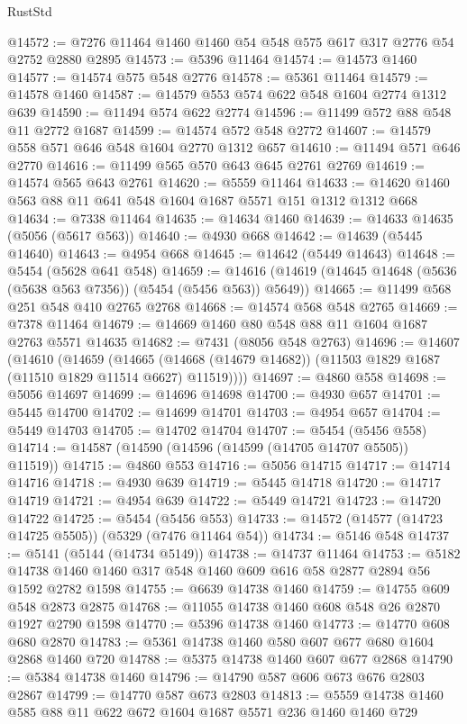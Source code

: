 \begin{lexlean}{RustStd}
\begin{coremodule}
@14572 := @7276 @11464 @1460 @1460 @54 @548 @575 @617 @317 @2776 @54 @2752 @2880 @2895
@14573 := @5396 @11464
@14574 := @14573 @1460
@14577 := @14574 @575 @548 @2776
@14578 := @5361 @11464
@14579 := @14578 @1460
@14587 := @14579 @553 @574 @622 @548 @1604 @2774 @1312 @639
@14590 := @11494 @574 @622 @2774
@14596 := @11499 @572 @88 @548 @11 @2772 @1687
@14599 := @14574 @572 @548 @2772
@14607 := @14579 @558 @571 @646 @548 @1604 @2770 @1312 @657
@14610 := @11494 @571 @646 @2770
@14616 := @11499 @565 @570 @643 @645 @2761 @2769
@14619 := @14574 @565 @643 @2761
@14620 := @5559 @11464
@14633 := @14620 @1460 @563 @88 @11 @641 @548 @1604 @1687 @5571 @151 @1312 @1312 @668
@14634 := @7338 @11464
@14635 := @14634 @1460
@14639 := @14633 @14635 (@5056 (@5617 @563))
@14640 := @4930 @668
@14642 := @14639 (@5445 @14640)
@14643 := @4954 @668
@14645 := @14642 (@5449 @14643)
@14648 := @5454 (@5628 @641 @548)
@14659 := @14616 (@14619 (@14645 @14648 (@5636 (@5638 @563 @7356)) (@5454 (@5456 @563)) @5649))
@14665 := @11499 @568 @251 @548 @410 @2765 @2768
@14668 := @14574 @568 @548 @2765
@14669 := @7378 @11464
@14679 := @14669 @1460 @80 @548 @88 @11 @1604 @1687 @2763 @5571 @14635
@14682 := @7431 (@8056 @548 @2763)
@14696 := @14607
    (@14610
      (@14659
        (@14665 (@14668 (@14679 @14682)) (@11503 @1829 @1687 (@11510 @1829 @11514 @6627) @11519))))
@14697 := @4860 @558
@14698 := @5056 @14697
@14699 := @14696 @14698
@14700 := @4930 @657
@14701 := @5445 @14700
@14702 := @14699 @14701
@14703 := @4954 @657
@14704 := @5449 @14703
@14705 := @14702 @14704
@14707 := @5454 (@5456 @558)
@14714 := @14587 (@14590 (@14596 (@14599 (@14705 @14707 @5505)) @11519))
@14715 := @4860 @553
@14716 := @5056 @14715
@14717 := @14714 @14716
@14718 := @4930 @639
@14719 := @5445 @14718
@14720 := @14717 @14719
@14721 := @4954 @639
@14722 := @5449 @14721
@14723 := @14720 @14722
@14725 := @5454 (@5456 @553)
@14733 := @14572 (@14577 (@14723 @14725 @5505)) (@5329 (@7476 @11464 @54))
@14734 := @5146 @548
@14737 := @5141 (@5144 (@14734 @5149))
@14738 := @14737 @11464
@14753 := @5182 @14738 @1460 @1460 @317 @548 @1460 @609 @616 @58 @2877 @2894 @56 @1592 @2782 @1598
@14755 := @6639 @14738 @1460
@14759 := @14755 @609 @548 @2873 @2875
@14768 := @11055 @14738 @1460 @608 @548 @26 @2870 @1927 @2790 @1598
@14770 := @5396 @14738 @1460
@14773 := @14770 @608 @680 @2870
@14783 := @5361 @14738 @1460 @580 @607 @677 @680 @1604 @2868 @1460 @720
@14788 := @5375 @14738 @1460 @607 @677 @2868
@14790 := @5384 @14738 @1460
@14796 := @14790 @587 @606 @673 @676 @2803 @2867
@14799 := @14770 @587 @673 @2803
@14813 := @5559 @14738 @1460 @585 @88 @11 @622 @672 @1604 @1687 @5571 @236 @1460 @1460 @729

\end{coremodule}
\end{lexlean}
